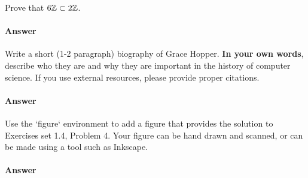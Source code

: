 \documentclass{article}
\begin{document}


\collab{\todo{}}

Prove that $6{\mathbb Z} \subset 2{\mathbb Z}$.

\paragraph{Answer}



\collab{\todo{}}

Write a short (1-2 paragraph) biography of Grace Hopper.
\textbf{In your own words}, describe who they are and why they are important in
the history of computer science.  If you use external resources, please provide
proper citations.

\paragraph{Answer}


\collab{\todo{}}

Use the `figure` environment to add a figure that provides the solution to
Exercises set 1.4, Problem 4.  Your figure can be hand drawn and scanned, or can
be made using a tool such as Inkscape.

\paragraph{Answer}

\end{document}
